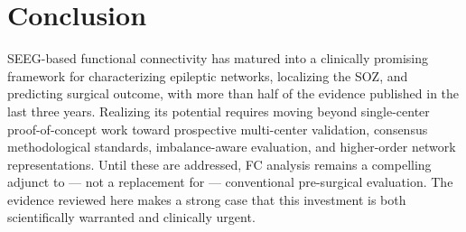 \documentclass[12pt]{article}
\begin{document}
\begin{table}[htbp]
  \centering
  \small
  \caption*{\textbf{Box 1.} Reporting checklist for SEEG functional connectivity
  studies.}
  \end{table}

\section{Conclusion}
SEEG-based functional connectivity has matured into a clinically promising framework for characterizing epileptic networks, localizing the SOZ, and predicting surgical outcome, with more than half of the evidence published in the last three years. Realizing its potential requires moving beyond single-center proof-of-concept work toward prospective multi-center validation, consensus methodological standards, imbalance-aware evaluation, and higher-order network representations. Until these are addressed, FC analysis remains a compelling adjunct to --- not a replacement for --- conventional pre-surgical evaluation. The evidence reviewed here makes a strong case that this investment is both scientifically warranted and clinically urgent.
\end{document}
